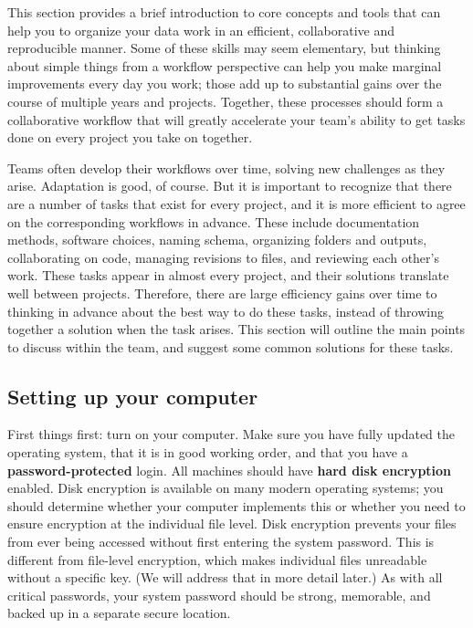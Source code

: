 This section provides a brief introduction to core concepts and tools
that can help you to organize your data work in an efficient, collaborative and reproducible manner.
Some of these skills may seem elementary,
but thinking about simple things from a workflow perspective
can help you make marginal improvements every day you work;
those add up to substantial gains over the course of multiple years and projects.
Together, these processes should form a collaborative workflow
that will greatly accelerate your team's ability to get tasks done
on every project you take on together.

Teams often develop their workflows over time,
solving new challenges as they arise.
Adaptation is good, of course. But it is important to recognize
that there are a number of tasks that exist for every project,
and it is more efficient to agree on the corresponding workflows in advance.
These include documentation methods, software choices,
naming schema, organizing folders and outputs, collaborating on code,
managing revisions to files, and reviewing each other's work.
These tasks appear in almost every project,
and their solutions translate well between projects.
Therefore, there are large efficiency gains over time to
thinking in advance about the best way to do these tasks,
instead of throwing together a solution when the task arises.
This section will outline the main points to discuss within the team,
and suggest some common solutions for these tasks.

\subsection{Setting up your computer}

First things first: turn on your computer.
Make sure you have fully updated the operating system,
that it is in good working order,
and that you have a \textbf{password-protected} login.
All machines should have \textbf{hard disk encryption} enabled.
Disk encryption is available on many modern operating systems;
you should determine whether your computer implements this
or whether you need to ensure encryption at the individual file level.
Disk encryption prevents your files from ever being accessed
without first entering the system password.
This is different from file-level encryption,
which makes individual files unreadable without a specific key.
(We will address that in more detail later.)
As with all critical passwords, your system password should be strong,
memorable, and backed up in a separate secure location.

